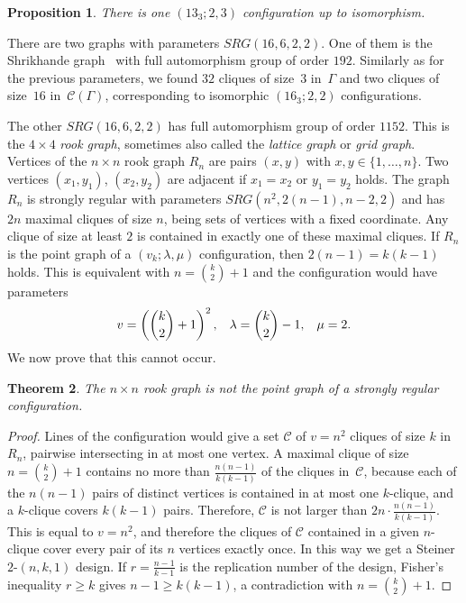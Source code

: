 \documentclass[12pt, reqno]{amsart}
\newtheorem{theorem}{Theorem}[section]
\newtheorem{proposition}[theorem]{Proposition}
\def\C{\mathcal{C}}
\begin{document}
\begin{proposition}\label{src13}
There is one $(13_3;2,3)$ configuration up to isomorphism.
\end{proposition}

There are two graphs with parameters $SRG(16,6,2,2)$. One of them is the
Shrikhande graph~\cite{SSS59} with full automorphism group of order $192$.
Similarly as for the previous parameters, we found $32$ cliques of size~$3$ in~$\Gamma$
and two cliques of size~$16$ in~$\C(\Gamma)$, corresponding
to isomorphic $(16_3;2,2)$ configurations.

The other $SRG(16,6,2,2)$ has full automorphism group of order $1152$. This is
the $4\times 4$ \emph{rook graph}, sometimes also called the \emph{lattice graph}
or \emph{grid graph}. Vertices of the $n\times n$ rook
graph $R_n$ are pairs $(x,y)$ with $x,y\in\{1,\ldots,n\}$.
Two vertices $(x_1,y_1)$, $(x_2,y_2)$ are adjacent if $x_1=x_2$ or $y_1=y_2$ holds.
The graph $R_n$ is strongly regular with parameters $SRG(n^2,2(n-1),n-2,2)$ and has
$2n$ maximal cliques of size $n$, being sets of vertices with a fixed coordinate.
Any clique of size at least $2$ is contained in exactly one of these maximal cliques.
If $R_n$ is the point graph of a $(v_k;\lambda,\mu)$ configuration, then $2(n-1)=k(k-1)$
holds. This is equivalent with $n={k\choose 2}+1$ and the configuration
would have parameters
\begin{equation}\label{rookparam}
v=\left( {k\choose 2}+1\right)^2,\kern 3mm \lambda={k\choose 2}-1,\kern 3mm \mu=2.
\end{equation}
We now prove that this cannot occur.

\begin{theorem}\label{thmrook}
The $n\times n$ rook graph is not the point graph of a strongly regular configuration.
\end{theorem}

\begin{proof}
Lines of the configuration would give a set $\C$ of $v=n^2$ cliques of size $k$
in $R_n$, pairwise intersecting in at most one vertex. A maximal clique of size
$n={k\choose 2}+1$ contains no more than $\frac{n(n-1)}{k(k-1)}$ of the cliques
in~$\C$, because each of the $n(n-1)$ pairs of
distinct vertices is contained in at most one $k$-clique, and a $k$-clique covers
$k(k-1)$ pairs. Therefore, $\C$ is not larger than $2n\cdot \frac{n(n-1)}{k(k-1)}$.
This is equal to $v=n^2$, and therefore the cliques of $\C$ contained in a given
$n$-clique cover every pair of its $n$ vertices exactly once. In this way we get
a Steiner $2$-$(n,k,1)$ design. If $r=\frac{n-1}{k-1}$ is the replication number
of the design, Fisher's inequality $r\ge k$ gives $n-1\ge k(k-1)$, a
contradiction with $n={k\choose 2}+1$.
\end{proof}
\end{document}
